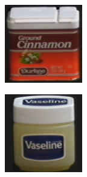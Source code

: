 \begin{figure}[htbp]
\begin{subfigure}{80pt}
    \caption{}
	\end{subfigure}
	\begin{subfigure}{80pt}
        \centering
    \includegraphics[width=\textwidth]{figures/coil_original/39.png}
    \caption{}
	\end{subfigure}
	\begin{subfigure}{80pt}
        \centering
    \includegraphics[width=\textwidth]{figures/coil_original/55.png}

\end{subfigure}
\end{figure}
